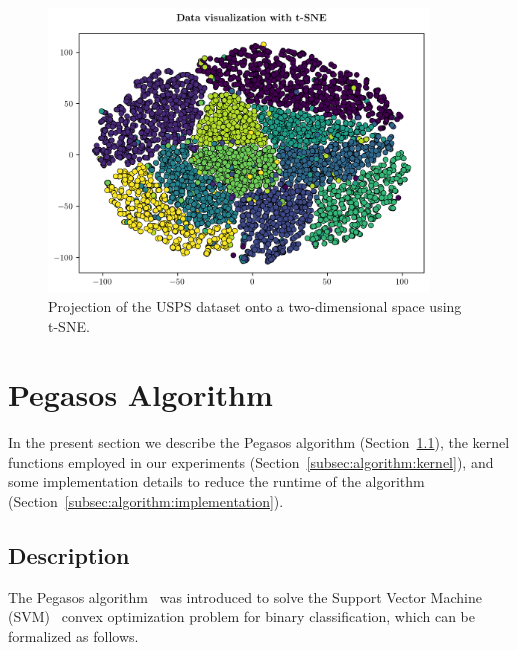 \documentclass[runningheads]{llncs}
\begin{document}
\begin{figure}
  \center
  \includegraphics[width=0.9\textwidth]{../img/tsne.png}
  \caption{Projection of the USPS dataset onto a two-dimensional space using t-SNE.} 
  \label{fig:dataset:tsne}
\end{figure}

\section{Pegasos Algorithm}
\label{sec:algorithm}

In the present section we describe the Pegasos algorithm (Section~\ref{subsec:algorithm:description}), the kernel functions employed in our experiments (Section~\ref{subsec:algorithm:kernel}), and some implementation details to reduce the runtime of the algorithm (Section~\ref{subsec:algorithm:implementation}).

\subsection{Description}
\label{subsec:algorithm:description}

The Pegasos algorithm~\cite{shalev-pegasos-2011} was introduced to solve the Support Vector Machine (SVM)~\cite{vapnik-1999-statistical-learning} convex optimization problem for binary classification, which can be formalized as follows. 
\end{document}
